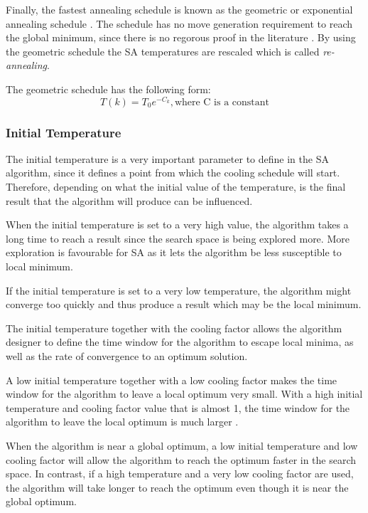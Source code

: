 Finally, the fastest annealing schedule is known as the geometric or exponential annealing schedule \cite{SASingleMultiObj}. The schedule has no move generation requirement to reach the global minimum, since there is no regorous proof in the literature \cite{SASingleMultiObj}. By using the geometric schedule the \gls{SA} temperatures are rescaled which is called \emph{re-annealing}\cite{VeryFastSAImageEnchancement}.

The geometric schedule has the following form:
\begin{equation}
\label{eq:geocooling}
	T(k)=T_0e^{-C_k},\text{where C is a constant}
\end{equation}

\subsubsection{Initial Temperature}
The initial temperature is a very important parameter to define in the \gls{SA} algorithm, since it defines a point from which the cooling schedule will start\cite{VariousCoolingSA}. Therefore, depending on what the initial value of the temperature, is the final result that the algorithm will produce can be influenced\cite{SALongestCommon,AutoConfigSA}.

When the initial temperature is set to a very high value, the algorithm takes a long time to reach a result since the search space is being explored more\cite{SALongestCommon,VariousCoolingSA}. More exploration is favourable for \gls{SA} as it lets the algorithm be less susceptible to local minimum. 

If the initial temperature is set to a very low temperature, the algorithm might converge too quickly and thus produce a result which may be the local minimum\cite{SALongestCommon,VariousCoolingSA,AutoConfigSA}.

The initial temperature together with the cooling factor allows the algorithm designer to define the time window for the algorithm to escape local minima, as well as the rate of convergence to an optimum solution\cite{SALongestCommon,VariousCoolingSA}.

A low initial temperature together with a low cooling factor makes the time window for the algorithm to leave a local optimum very small\cite{SALongestCommon}. With a high initial temperature and cooling factor value that is almost 1, the time window for the algorithm to leave the local optimum is much larger \cite{SALongestCommon}. 

When the algorithm is near a global optimum, a low initial temperature and low cooling factor will allow the algorithm to reach the optimum faster in the search space\cite{SALongestCommon}. In contrast, if a high temperature and a very low cooling factor are used, the algorithm will take longer to reach the optimum even though it is near the global optimum\cite{SALongestCommon}.

